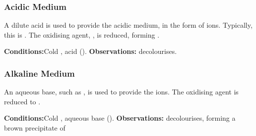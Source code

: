 	\subsubsection{Acidic Medium}

	A dilute acid is used to provide the acidic medium, in the form of  ions. Typically, this is . The oxidising
	agent, , is reduced, forming .

	\vspace{1.5em}
	\vbox{\textbf{Conditions:}\tabto{35mm}Cold , acid ().}	%
	\vbox{\textbf{Observations:}  decolourises.}





	\subsubsection{Alkaline Medium}

	An aqueous base, such as , is used to provide the  ions. The oxidising agent  is reduced to
	.

	\vspace{1.5em}
	\vbox{\textbf{Conditions:}\tabto{35mm}Cold , aqueous base ().}\vspace{0.5em}
	\vbox{\textbf{Observations:}  decolourises, forming
		a {\color{Brown}brown} precipitate of }



